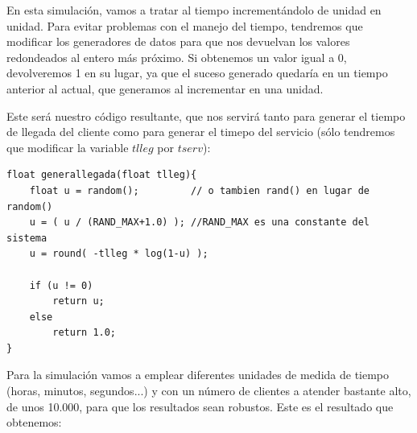 \documentclass[11pt,a4paper]{report}
\begin{document}
En esta simulación, vamos a tratar al tiempo incrementándolo de unidad en unidad. Para evitar problemas con el manejo del tiempo, tendremos que modificar
los generadores de datos para que nos devuelvan los valores redondeados al entero más próximo. Si obtenemos un valor igual a 0, devolveremos 1 en su lugar,
ya que el suceso generado quedaría en un tiempo anterior al actual, que generamos al incrementar en una unidad.

Este será nuestro código resultante, que nos servirá tanto para generar el tiempo de llegada del cliente como para generar el timepo del servicio (sólo
tendremos que modificar la variable $tlleg$ por $tserv$):
\newpage
\begin{lstlisting}
float generallegada(float tlleg){
	float u = random();         // o tambien rand() en lugar de random()
	u = ( u / (RAND_MAX+1.0) ); //RAND_MAX es una constante del sistema
	u = round( -tlleg * log(1-u) );

	if (u != 0)
		return u;
	else
		return 1.0;
}
\end{lstlisting}


Para la simulación vamos a emplear diferentes unidades de medida de tiempo (horas, minutos, segundos...) y con un número de clientes a atender bastante alto,
de unos 10.000, para que los resultados sean robustos. Este es el resultado que obtenemos:
\begin{table}[H]
\end{table}
\end{document}
